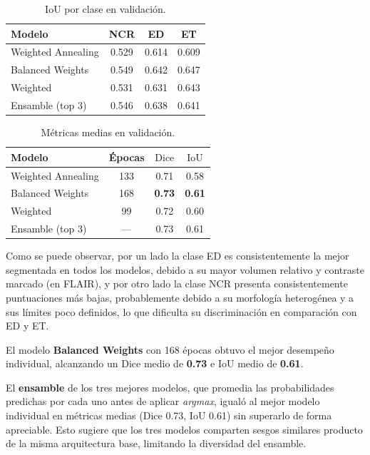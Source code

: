 \begin{table}[H]
\centering
\small
\setlength{\tabcolsep}{2pt}
\begin{tabular}{|l|c|c|c|}
\hline
\textbf{Modelo} & \textbf{NCR} & \textbf{ED} & \textbf{ET} \\
\hline
Weighted Annealing & 0.529 & 0.614 & 0.609 \\
Balanced Weights   & 0.549 & 0.642 & 0.647 \\
Weighted           & 0.531 & 0.631 & 0.643 \\
\hline
Ensamble (top 3)   & 0.546 & 0.638 & 0.641 \\
\hline
\end{tabular}
\caption{IoU por clase en validación.}
\label{tab:iou_clase}
\end{table}

\begin{table}[H]
\centering
\small
\setlength{\tabcolsep}{2pt}
\begin{tabular}{|l|c|c|c|}
\hline
\textbf{Modelo} & \textbf{Épocas} & \textbf{$\text{Dice}$} & \textbf{$\text{IoU}$} \\
\hline
Weighted Annealing & 133 & 0.71 & 0.58 \\
Balanced Weights   & 168 & \textbf{0.73} & \textbf{0.61} \\
Weighted           & 99 & 0.72 & 0.60 \\
\hline
Ensamble (top 3)   & --- & 0.73 & 0.61 \\
\hline
\end{tabular}
\caption{Métricas medias en validación.}
\label{tab:medias}
\end{table}

Como se puede observar, por un lado la clase ED es consistentemente la mejor segmentada en todos los modelos, debido a su mayor volumen relativo y contraste marcado (en FLAIR), y por otro lado la clase NCR presenta consistentemente puntuaciones más bajas, probablemente debido a su morfología heterogénea y a sus límites poco definidos, lo que dificulta su discriminación en comparación con ED y ET.

El modelo \textbf{Balanced Weights} con 168 épocas obtuvo el mejor desempeño individual, alcanzando un Dice medio de \textbf{0.73} e IoU medio de \textbf{0.61}. 

El \textbf{ensamble} de los tres mejores modelos, que promedia las probabilidades predichas por cada uno antes de aplicar \textit{argmax}, igualó al mejor modelo individual en métricas medias (Dice 0.73, IoU 0.61) sin superarlo de forma apreciable. Esto sugiere que los tres modelos comparten sesgos similares producto de la misma arquitectura base, limitando la diversidad del ensamble.

